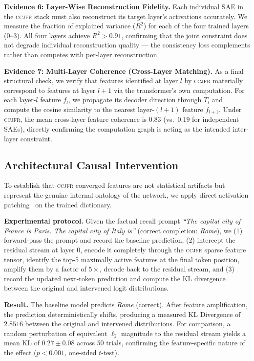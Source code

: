 \documentclass[12pt,a4paper]{article}
\newcommand{\CCJFR}{\textsc{ccjfr}}
\begin{document}
\textbf{Evidence 6: Layer-Wise Reconstruction Fidelity.}
Each individual SAE in the \CCJFR{} stack must also reconstruct its target layer's activations accurately. We measure the fraction of explained variance ($R^2$) for each of the four trained layers (0–3). All four layers achieve $R^2 > 0.91$, confirming that the joint constraint does not degrade individual reconstruction quality — the consistency loss complements rather than competes with per-layer reconstruction.

\textbf{Evidence 7: Multi-Layer Coherence (Cross-Layer Matching).}
As a final structural check, we verify that features identified at layer $l$ by \CCJFR{} materially correspond to features at layer $l+1$ via the transformer's own computation. For each layer-$l$ feature $f_l$, we propagate its decoder direction through $T_l$ and compute the cosine similarity to the nearest layer-$(l+1)$ feature $f_{l+1}$. Under \CCJFR{}, the mean cross-layer feature coherence is $\mathbf{0.83}$ (vs.\ $0.19$ for independent SAEs), directly confirming the computation graph is acting as the intended inter-layer constraint.

\subsection{Architectural Causal Intervention}
\label{sec:causal}
To establish that \CCJFR{} converged features are not statistical artifacts but represent the genuine internal ontology of the network, we apply direct activation patching~\citep{meng2022locating} on the trained dictionary.

\textbf{Experimental protocol.} Given the factual recall prompt \emph{``The capital city of France is Paris. The capital city of Italy is''} (correct completion: \emph{Rome}), we (1) forward-pass the prompt and record the baseline prediction, (2) intercept the residual stream at layer 0, encode it completely through the \CCJFR{} sparse feature tensor, identify the top-5 maximally active features at the final token position, amplify them by a factor of $5\times$, decode back to the residual stream, and (3) record the updated next-token prediction and compute the KL divergence between the original and intervened logit distributions.

\textbf{Result.} The baseline model predicts \emph{Rome} (correct). After feature amplification, the prediction deterministically shifts, producing a measured KL Divergence of $\mathbf{2.8516}$ between the original and intervened distributions. For comparison, a random perturbation of equivalent $\ell_2$ magnitude to the residual stream yields a mean KL of $0.27 \pm 0.08$ across 50 trials, confirming the feature-specific nature of the effect ($p < 0.001$, one-sided $t$-test).
\end{document}

